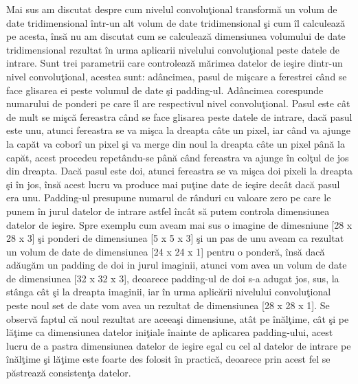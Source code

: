 \par

Mai sus am discutat despre cum nivelul convolu\c{t}ional transform\u{a} un volum de date tridimensional \^{i}ntr-un alt volum de date tridimensional \c{s}i cum \^{i}l calculeaz\u{a} pe acesta, \^{i}ns\u{a} nu am discutat cum se calculeaz\u{a} dimensiunea volumului de date tridimensional rezultat \^{i}n urma aplicarii nivelului convolu\c{t}ional peste  datele de intrare. Sunt trei parametrii care controleaz\u{a} m\u{a}rimea datelor de ie\c{s}ire dintr-un nivel convolu\c{t}ional, acestea sunt: ad\^{a}ncimea, pasul de mi\c{s}care a ferestrei c\^{a}nd se face glisarea ei peste volumul de date \c{s}i padding-ul. Ad\^{a}ncimea corespunde numarului de ponderi pe care \^{i}l are respectivul nivel convolu\c{t}ional. Pasul este c\^{a}t de mult se mi\c{s}c\u{a} fereastra c\^{a}nd se face glisarea peste datele de intrare, dac\u{a} pasul este unu, atunci fereastra se va mi\c{s}ca la dreapta c\^{a}te un pixel, iar c\^{a}nd va ajunge la cap\u{a}t va cobor\^{i} un pixel \c{s}i va merge din noul la dreapta c\^{a}te un pixel p\^{a}n\u{a} la cap\u{a}t, acest procedeu repet\^{a}ndu-se p\^{a}n\u{a} c\^{a}nd fereastra va ajunge \^{i}n col\c{t}ul de jos din dreapta. Dac\u{a} pasul este doi, atunci fereastra se va mi\c{s}ca doi pixeli la dreapta \c{s}i \^{i}n jos, \^{i}ns\u{a} acest lucru va produce mai pu\c{t}ine date de ie\c{s}ire dec\^{a}t dac\u{a} pasul era unu. Padding-ul presupune numarul de r\^{a}nduri cu valoare zero pe care le punem \^{i}n jurul datelor de intrare astfel \^{i}nc\^{a}t s\u{a} putem controla dimensiunea datelor de ie\c{s}ire. Spre exemplu cum aveam mai sus o imagine de dimesniune [28 x 28 x 3] \c{s}i ponderi de dimensiunea [5 x 5 x 3] \c{s}i un pas de unu aveam ca rezultat un volum de date de dimensiunea [24 x 24 x 1] pentru o ponder\u{a}, \^{i}ns\u{a} dac\u{a} ad\u{a}ug\u{a}m un padding de doi in jurul imaginii, atunci vom avea un volum de date de dimensiunea [32 x 32 x 3], deoarece padding-ul de doi s-a adugat jos, sus, la st\^{a}nga c\^{a}t \c{s}i la dreapta imaginii, iar \^{i}n urma aplic\u{a}rii nivelului convolu\c{t}ional peste noul set de date vom avea un rezultat de dimensiunea [28 x 28 x 1]. Se observ\u{a} faptul c\u{a} noul rezultat are aceea\c{s}i dimensiune, at\^{a}t pe \^{i}n\u{a}l\c{t}ime, c\^{a}t \c{s}i pe l\u{a}\c{t}ime ca dimensiunea datelor ini\c{t}iale \^{i}nainte de aplicarea padding-ului, acest lucru  de a pastra dimensiunea datelor de ie\c{s}ire egal cu cel al datelor de intrare pe \^{i}n\u{a}l\c{t}ime \c{s}i l\u{a}\c{t}ime este foarte des folosit \^{i}n practic\u{a}, deoarece prin acest fel se p\u{a}streaz\u{a} consisten\c{t}a datelor.

